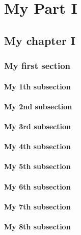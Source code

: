 \documentclass[fontsize=10pt,open=any,twocolumn]{scrbook}[2019/10/12]%
\begin{document}
\tableofcontents

\part{My Part I}

    \chapter{My chapter I}
    
    \begin{strip}
    \minitoc
    \end{strip}
        \section{My first section}
            \blindtext
        \subsection{My 1th subsection}
            \blindtext
        \subsection{My 2nd subsection}
            \blindtext
        \subsection{My 3rd subsection}
            \blindtext
        \subsection{My 4th subsection}
            \blindtext
        \subsection{My 5th subsection}
            \blindtext
        \subsection{My 6th subsection}
            \blindtext
        \subsection{My 7th subsection}
            \blindtext
        \subsection{My 8th subsection}
            \blindtext
\end{document}
